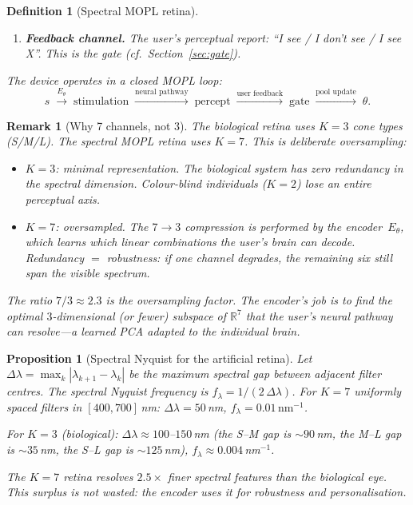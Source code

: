 \documentclass[11pt,a4paper]{article}
\newtheorem{proposition}[theorem]{Proposition}
\newtheorem{definition}[theorem]{Definition}
\newtheorem{remark}[theorem]{Remark}
\newcommand{\R}{\mathbb{R}}
\begin{document}
\begin{definition}[Spectral MOPL retina]
\begin{enumerate}[nosep]
\item \textbf{Feedback channel.}
  The user's perceptual report: ``I see / I don't see /
  I see \emph{X}''.
  This is the gate
  (cf.\ Section~\ref{sec:gate}).
\end{enumerate}
The device operates in a closed MOPL loop:
\begin{equation}\label{eq:retina-mopl}
  s \;\xrightarrow{E_\theta}\;
  \text{stimulation}
  \;\xrightarrow{\text{neural pathway}}\;
  \text{percept}
  \;\xrightarrow{\text{user feedback}}\;
  \text{gate}
  \;\xrightarrow{\text{pool update}}\;
  \theta.
\end{equation}
\end{definition}

\begin{remark}[Why 7 channels, not 3]%
\label{rem:why-7}
The biological retina uses $K = 3$ cone types (S/M/L).
The spectral MOPL retina uses $K = 7$.
This is deliberate oversampling:
\begin{itemize}[nosep]
\item $K = 3$: minimal representation.
  The biological system has zero redundancy
  in the spectral dimension.
  Colour-blind individuals ($K = 2$) lose an entire
  perceptual axis.
\item $K = 7$: oversampled.
  The $7 \to 3$ compression is performed by the
  encoder~$E_\theta$, which \emph{learns} which linear
  combinations the user's brain can decode.
  Redundancy $= $ robustness:
  if one channel degrades, the remaining six still
  span the visible spectrum.
\end{itemize}
The ratio $7/3 \approx 2.3$ is the oversampling factor.
The encoder's job is to find the optimal
$3$-dimensional (or fewer) subspace of $\R^7$ that
the user's neural pathway can resolve---a learned
PCA adapted to the individual brain.
\end{remark}

\begin{proposition}[Spectral Nyquist for the artificial retina]%
\label{prop:spectral-nyquist}
Let $\Delta\lambda = \max_{k} |\lambda_{k+1} - \lambda_k|$
be the maximum spectral gap between adjacent filter centres.
The spectral Nyquist frequency is
$f_{\lambda} = 1 / (2\,\Delta\lambda)$.
For $K = 7$ uniformly spaced filters in $[400, 700]$\,nm:
$\Delta\lambda = 50$\,nm,
$f_\lambda = 0.01\,\text{nm}^{-1}$.

For $K = 3$ (biological):
$\Delta\lambda \approx 100$--$150$\,nm
(the S--M gap is $\sim\!90$\,nm, the M--L gap is $\sim\!35$\,nm,
the S--L gap is $\sim\!125$\,nm),
$f_\lambda \approx 0.004$\,nm$^{-1}$.

The $K = 7$ retina resolves $2.5\times$ finer spectral
features than the biological eye.
This surplus is not wasted: the encoder uses it for
robustness and personalisation.
\end{proposition}
\end{document}
